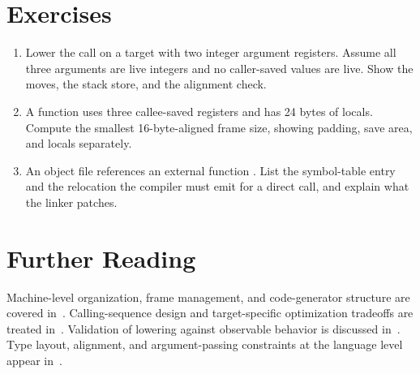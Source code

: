 \section{Exercises}\label{sec:ch24-exercises}

\begin{enumerate}
\item Lower the call  on a target with two integer argument registers. \label{ex:ch24-lower-three} Assume all three arguments are live integers and no caller-saved values are live. Show the moves, the stack store, and the alignment check.
\item A function uses three callee-saved registers and has 24 bytes of locals. \label{ex:ch24-frame-size} Compute the smallest 16-byte-aligned frame size, showing padding, save area, and locals separately.
\item An object file references an external function . \label{ex:ch24-reloc} List the symbol-table entry and the relocation the compiler must emit for a direct call, and explain what the linker patches.
\end{enumerate}

\section{Further Reading}\label{sec:ch24-reading}

Machine-level organization, frame management, and code-generator structure are covered in~\cite{appel-1998-modern}.
Calling-sequence design and target-specific optimization tradeoffs are treated in~\cite{morgan-1998-optimizing}.
Validation of lowering against observable behavior is discussed in~\cite{safonov-2010-trustworthy}.
Type layout, alignment, and argument-passing constraints at the language level appear in~\cite{wg14-2011-c11}.
